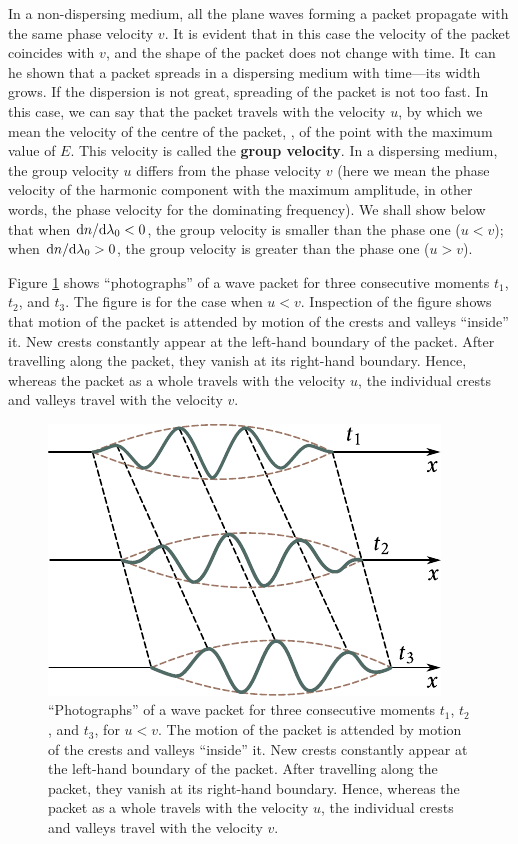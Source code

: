 In a non-dispersing medium, all the plane waves forming a packet propagate with the same phase velocity $v$.
It is evident that in this case the velocity of the packet coincides with $v$, and the shape of the
packet does not change with time.
It can he shown that a packet spreads in a dispersing medium with time---its width grows.
If the dispersion is not great, spreading of the packet is not too fast.
In this case, we can say that the packet travels with the velocity $u$, by which we mean the velocity of the centre of the packet, \ie, of the point with the maximum value of $E$.
This velocity is called the \textbf{group velocity}.
In a dispersing medium, the group velocity $u$ differs from the phase velocity $v$ (here we mean the phase velocity of the harmonic component with the maximum amplitude, in other words, the phase velocity for the dominating frequency).
We shall show below that when $\mathrm{d} n/\mathrm{d}\lambda_0<0$, the group velocity is smaller than the phase one ($u<v$); when $\mathrm{d} n/\mathrm{d}\lambda_0>0$, the group velocity is greater than the phase one ($u>v$).

Figure \ref{fig:20_3} shows ``photographs'' of a wave packet for three consecutive moments $t_1$, $t_2$, and $t_3$.
The figure is for the case when $u<v$.
Inspection of the figure shows that motion of the packet is attended by motion of the crests and valleys ``inside'' it.
New crests constantly appear at the left-hand boundary of the packet.
After travelling along the packet, they vanish at its right-hand boundary.
Hence, whereas the packet as a whole travels with the velocity $u$, the individual crests and valleys travel with the velocity $v$.

\begin{figure}[t]
	\begin{center}
		\includegraphics[scale=1]{figures/ch_20/fig_20_3.pdf}
        \caption[]{``Photographs'' of a wave packet for three consecutive moments $t_1$, $t_2$, and $t_3$, for $u<v$. The motion of the packet is attended by motion of the crests and valleys ``inside'' it. New crests constantly appear at the left-hand boundary of the packet. After travelling along the packet, they vanish at its right-hand boundary. Hence, whereas the packet as a whole travels with the velocity $u$, the individual crests and valleys travel with the velocity $v$.}
		\label{fig:20_3}
	\end{center}
	\vspace{-0.8cm}
\end{figure}

